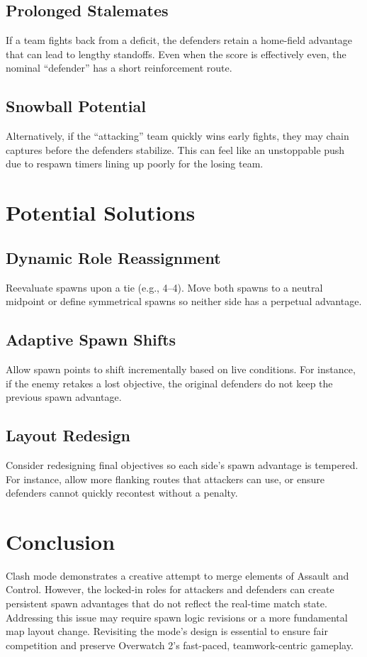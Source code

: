 \documentclass[12pt]{article}
\begin{document}
\subsection{Prolonged Stalemates}
If a team fights back from a deficit, the defenders retain a home-field advantage 
that can lead to lengthy standoffs. Even when the score is effectively even, 
the nominal ``defender'' has a short reinforcement route.

\subsection{Snowball Potential}
Alternatively, if the ``attacking'' team quickly wins early fights, they may chain 
captures before the defenders stabilize. This can feel like an unstoppable push 
due to respawn timers lining up poorly for the losing team.

\section{Potential Solutions}

\subsection{Dynamic Role Reassignment}
Reevaluate spawns upon a tie (e.g., 4--4). Move both spawns to a neutral midpoint 
or define symmetrical spawns so neither side has a perpetual advantage.

\subsection{Adaptive Spawn Shifts}
Allow spawn points to shift incrementally based on live conditions. For instance, 
if the enemy retakes a lost objective, the original defenders do not keep the 
previous spawn advantage.

\subsection{Layout Redesign}
Consider redesigning final objectives so each side’s spawn advantage is tempered. 
For instance, allow more flanking routes that attackers can use, or ensure defenders 
cannot quickly recontest without a penalty.

\section{Conclusion}
Clash mode demonstrates a creative attempt to merge elements of Assault and Control. 
However, the locked-in roles for attackers and defenders can create persistent 
spawn advantages that do not reflect the real-time match state. Addressing this 
issue may require spawn logic revisions or a more fundamental map layout change. 
Revisiting the mode’s design is essential to ensure fair competition and preserve 
Overwatch 2’s fast-paced, teamwork-centric gameplay.
\end{document}
